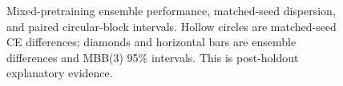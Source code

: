\documentclass[11pt,a4paper]{article}
\begin{document}
\begin{figure}[p]\centering

\caption{Mixed-pretraining ensemble performance, matched-seed dispersion, and paired circular-block intervals. Hollow circles are matched-seed CE differences; diamonds and horizontal bars are ensemble differences and MBB(3) 95\% intervals. This is post-holdout explanatory evidence.}
\end{figure}
\end{document}
